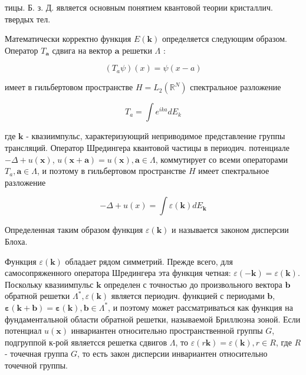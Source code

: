 \documentclass[10pt]{article}
\begin{document}
тицы. Б. з. Д. является основным понятием квантовой теории кристаллич. твердых тел.



Математически корректно функция $E(\boldsymbol{k})$ определяется следующим образом. Оператор $T_{\boldsymbol{a}}$ сдвига на вектор $\boldsymbol{a}$ решетки $\Lambda$ :



\[

\left(T_{a} \psi\right)(x)=\psi(x-a)

\]



имеет в гильбертовом пространстве $H=L_{2}\left(\mathbb{R}^{N}\right)$ спектральное разложение



\[

T_{a}=\int e^{i k a} d E_{k}

\]



где $\boldsymbol{k}$ - квазиимпульс, характеризующий неприводимое представление группы трансляций. Оператор Шредингера квантовой частицы в периодич. потенциале $-\Delta+u(\boldsymbol{x})$, $u(\boldsymbol{x}+\boldsymbol{a})=u(\boldsymbol{x}), \boldsymbol{a} \in \Lambda$, коммутирует со всеми операторами $T_{a}, \boldsymbol{a} \in \Lambda$, и поэтому в гильбертовом пространстве $H$ имеет спектральное разложение



\[

-\Delta+u(x)=\int \varepsilon(\boldsymbol{k}) d E_{\boldsymbol{k}}

\]



Определенная таким образом функция $\varepsilon(\boldsymbol{k})$ и называется законом дисперсии Блоха.



Функция $\varepsilon(\boldsymbol{k})$ обладает рядом симметрий. Прежде всего, для самосопряженного оператора Шредингера эта функция четная: $\varepsilon(-\boldsymbol{k})=\varepsilon(\boldsymbol{k})$. Поскольку квазиимпульс $\boldsymbol{k}$ определен с точностью до произвольного вектора $\boldsymbol{b}$ обратной решетки $\Lambda^{*}, \varepsilon(\boldsymbol{k})$ является периодич. функцией с периодами $\boldsymbol{b}$, $\boldsymbol{\varepsilon}(\boldsymbol{k}+\boldsymbol{b})=\boldsymbol{\varepsilon}(\boldsymbol{k}), \boldsymbol{b} \in \Lambda^{*}$, и поэтому может рассматриваться как функция на фундаментальной области обратной решетки, называемой Бриллюэна зоной. Если потенциал $u(\boldsymbol{x})$ инвариантен относительно пространственной группы $G$, подгруппой к-рой являетсся решетка сдвигов $\Lambda$, то $\varepsilon(r \boldsymbol{k})=\varepsilon(\boldsymbol{k}), r \in R$, где $R$ - точечная группа $G$, то есть закон дисперсии инвариантен относительно точечной группы.
\end{document}

